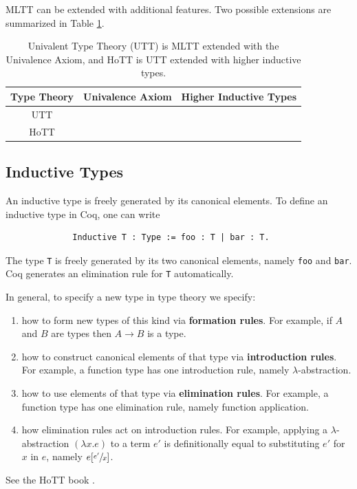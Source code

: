 \documentclass{amsart}
\newcommand{\cmark}{\ding{51}}%
\newcommand{\xmark}{\ding{55}}
\theoremstyle{definition}
\renewcommand{\emph}{\textbf}
\begin{document}
MLTT can be extended with additional features.
Two possible extensions are summarized in Table \ref{tb:extensions-of-mltt}.
\begin{table}[h]
    \centering
    \begin{tabular}{|c||c|c|}\hline
        Type Theory & Univalence Axiom & Higher Inductive Types\\\hline
        UTT  & \cmark & \xmark\\\hline
        HoTT & \cmark & \cmark\\\hline
    \end{tabular}
    \caption{Univalent Type Theory (UTT) is MLTT extended with the Univalence Axiom, and HoTT is UTT extended with higher inductive types.}
    \label{tb:extensions-of-mltt}
\end{table}

\subsection{Inductive Types}
\label{sec:inductive-types}
An inductive type is freely generated by its canonical elements.
To define an inductive type in Coq, one can write
\begin{figure}[H]
    \centering
    \begin{verbatim}
        Inductive T : Type := foo : T | bar : T.
    \end{verbatim}
\end{figure}
The type \texttt{T} is freely generated by its two canonical elements, namely \texttt{foo} and \texttt{bar}.
Coq generates an elimination rule for \texttt{T} automatically.

In general, to specify a new type in type theory we specify:
\begin{enumerate}
    \item how to form new types of this kind via \emph{formation rules}.
    For example, if $A$ and $B$ are types then $A \to B$ is a type.
    \item how to construct canonical elements of that type via \emph{introduction rules}.
    For example, a function type has one introduction rule, namely $\lambda$-abstraction.
    \item how to use elements of that type via \emph{elimination rules}.
    For example, a function type has one elimination rule, namely function application.
    \item how elimination rules act on introduction rules.
    For example, applying a $\lambda$-abstraction $(\lambda x.e)$ to a term $e'$ is definitionally equal to substituting $e'$ for $x$ in $e$, namely $e[\sfrac{e'}{x}]$. 
\end{enumerate}
See the HoTT book \cite{hottbook}.
\end{document}
